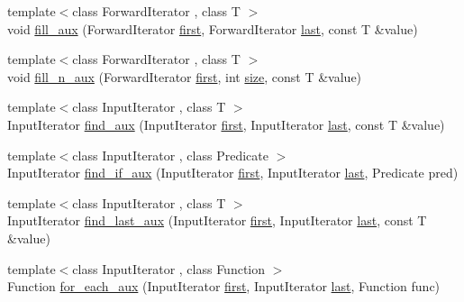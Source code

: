 \begin{DoxyCompactItemize}
\item 
{\footnotesize template$<$class Forward\+Iterator , class T $>$ }\\void \hyperlink{namespaceprism_a76092b4faa3c2a98088678943ad23df4}{fill\+\_\+aux} (Forward\+Iterator \hyperlink{namespaceprism_ae3fb7a1926a9e8e59300cd5e370470da}{first}, Forward\+Iterator \hyperlink{namespaceprism_abe4956c4e865f55ca126b7fb973b5078}{last}, const T \&value)
\item 
{\footnotesize template$<$class Forward\+Iterator , class T $>$ }\\void \hyperlink{namespaceprism_ad2e7f5f7dee0072f4741520356ebdaee}{fill\+\_\+n\+\_\+aux} (Forward\+Iterator \hyperlink{namespaceprism_ae3fb7a1926a9e8e59300cd5e370470da}{first}, int \hyperlink{namespaceprism_acd3c0f96adf158a29387191d79c4d874}{size}, const T \&value)
\item 
{\footnotesize template$<$class Input\+Iterator , class T $>$ }\\Input\+Iterator \hyperlink{namespaceprism_af23b68308b7ec11222bd2bfb2904c595}{find\+\_\+aux} (Input\+Iterator \hyperlink{namespaceprism_ae3fb7a1926a9e8e59300cd5e370470da}{first}, Input\+Iterator \hyperlink{namespaceprism_abe4956c4e865f55ca126b7fb973b5078}{last}, const T \&value)
\item 
{\footnotesize template$<$class Input\+Iterator , class Predicate $>$ }\\Input\+Iterator \hyperlink{namespaceprism_a91c456a075b03cfe290044281af93203}{find\+\_\+if\+\_\+aux} (Input\+Iterator \hyperlink{namespaceprism_ae3fb7a1926a9e8e59300cd5e370470da}{first}, Input\+Iterator \hyperlink{namespaceprism_abe4956c4e865f55ca126b7fb973b5078}{last}, Predicate pred)
\item 
{\footnotesize template$<$class Input\+Iterator , class T $>$ }\\Input\+Iterator \hyperlink{namespaceprism_a66df70426cdeee37f0c06a90881f1f36}{find\+\_\+last\+\_\+aux} (Input\+Iterator \hyperlink{namespaceprism_ae3fb7a1926a9e8e59300cd5e370470da}{first}, Input\+Iterator \hyperlink{namespaceprism_abe4956c4e865f55ca126b7fb973b5078}{last}, const T \&value)
\item 
{\footnotesize template$<$class Input\+Iterator , class Function $>$ }\\Function \hyperlink{namespaceprism_a9adcafd2357df71bd906d85ffe9fdf85}{for\+\_\+each\+\_\+aux} (Input\+Iterator \hyperlink{namespaceprism_ae3fb7a1926a9e8e59300cd5e370470da}{first}, Input\+Iterator \hyperlink{namespaceprism_abe4956c4e865f55ca126b7fb973b5078}{last}, Function func)

\end{DoxyCompactItemize}
